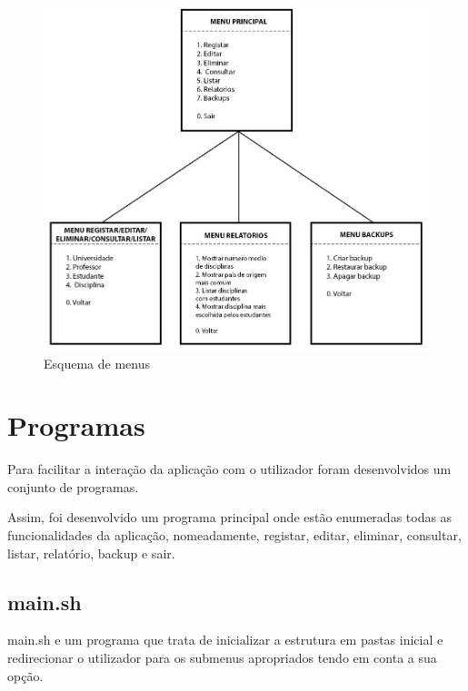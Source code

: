 \documentclass{article}
\begin{document}
\begin{figure}[h]
\centering
\includegraphics[scale=0.4]{images/esquema}
\caption{Esquema de menus}
\end{figure}

\pagebreak{}
\section{Programas}
\label{sec:orge1cc32e}

Para facilitar a interação da aplicação com o utilizador foram desenvolvidos um conjunto de programas.

Assim, foi desenvolvido um programa principal onde estão enumeradas todas as funcionalidades da aplicação, nomeadamente, registar, editar, eliminar, consultar, listar, relatório, backup e sair.

\subsection{main.sh}
\label{sec:org5bbb6c0}

main.sh e um programa que trata de inicializar a estrutura em pastas inicial e redirecionar o utilizador para os submenus apropriados tendo em conta a sua opção.
\end{document}
